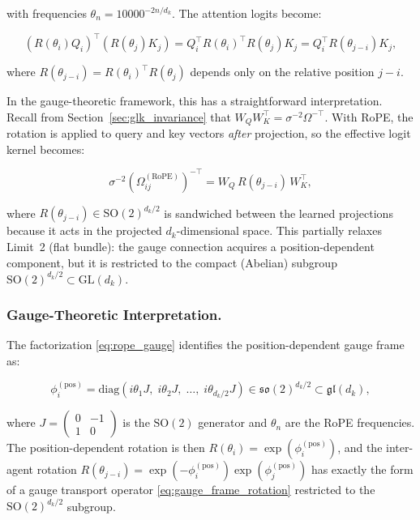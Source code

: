 \documentclass[twoside,11pt]{article}
\begin{document}
with frequencies $\theta_n = 10000^{-2n/d_k}$. The attention logits become:

\begin{equation}
(R(\theta_i) Q_i)^\top (R(\theta_j) K_j) = Q_i^\top R(\theta_i)^\top R(\theta_j) K_j = Q_i^\top R(\theta_{j-i}) K_j,
\label{eq:rope_relative}
\end{equation}

where $R(\theta_{j-i}) = R(\theta_i)^\top R(\theta_j)$ depends only on the relative position $j - i$.

In the gauge-theoretic framework, this has a straightforward interpretation. Recall from Section~\ref{sec:glk_invariance} that $W_Q W_K^\top = \sigma^{-2}\Omega^{-\top}$. With RoPE, the rotation is applied to query and key vectors \emph{after} projection, so the effective logit kernel becomes:

\begin{equation}
\sigma^{-2}(\Omega_{ij}^{(\mathrm{RoPE})})^{-\top} = W_Q\, R(\theta_{j-i})\, W_K^\top,
\label{eq:rope_gauge}
\end{equation}

where $R(\theta_{j-i}) \in \mathrm{SO}(2)^{d_k/2}$ is sandwiched between the learned projections because it acts in the projected $d_k$-dimensional space. This partially relaxes Limit~2 (flat bundle): the gauge connection acquires a position-dependent component, but it is restricted to the compact (Abelian) subgroup $\mathrm{SO}(2)^{d_k/2} \subset \mathrm{GL}(d_k)$.

\subsubsection{Gauge-Theoretic Interpretation.}

The factorization \eqref{eq:rope_gauge} identifies the position-dependent gauge frame as:

\begin{equation}
\phi_i^{(\mathrm{pos})} = \mathrm{diag}(i\theta_1 J, \; i\theta_2 J, \; \ldots, \; i\theta_{d_k/2} J) \in \mathfrak{so}(2)^{d_k/2} \subset \mathfrak{gl}(d_k),
\label{eq:rope_lie_algebra}
\end{equation}

where $J = \left(\begin{smallmatrix} 0 & -1 \\ 1 & 0 \end{smallmatrix}\right)$ is the $\mathrm{SO}(2)$ generator and $\theta_n$ are the RoPE frequencies. The position-dependent rotation is then $R(\theta_i) = \exp(\phi_i^{(\mathrm{pos})})$, and the inter-agent rotation $R(\theta_{j-i}) = \exp(-\phi_i^{(\mathrm{pos})})\exp(\phi_j^{(\mathrm{pos})})$ has exactly the form of a gauge transport operator \eqref{eq:gauge_frame_rotation} restricted to the $\mathrm{SO}(2)^{d_k/2}$ subgroup. 
\end{document}
